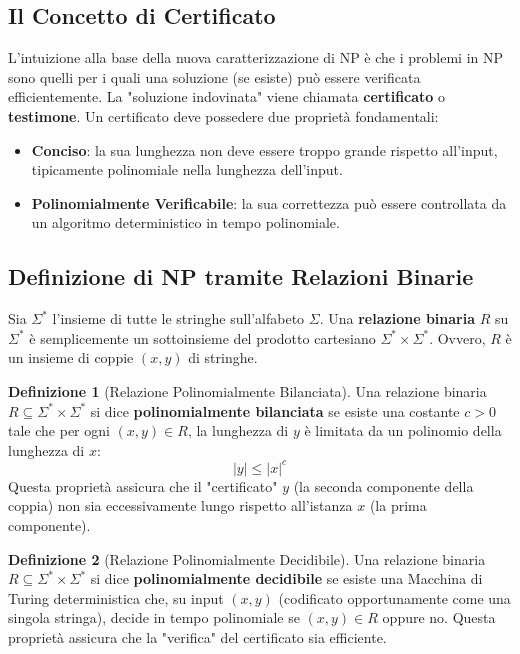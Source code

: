 \documentclass[a4paper]{article}
\theoremstyle{definition} %
\newtheorem{definition}{Definizione}
\begin{document}
\subsection{Il Concetto di Certificato}
L'intuizione alla base della nuova caratterizzazione di NP è che i problemi in NP sono quelli per i quali una soluzione (se esiste) può essere verificata efficientemente. La "soluzione indovinata" viene chiamata \textbf{certificato} o \textbf{testimone}.
Un certificato deve possedere due proprietà fondamentali:
\begin{itemize}
    \item \textbf{Conciso}: la sua lunghezza non deve essere troppo grande rispetto all'input, tipicamente polinomiale nella lunghezza dell'input.
    \item \textbf{Polinomialmente Verificabile}: la sua correttezza può essere controllata da un algoritmo deterministico in tempo polinomiale.
\end{itemize}

\subsection{Definizione di NP tramite Relazioni Binarie}

Sia $\Sigma^*$ l'insieme di tutte le stringhe sull'alfabeto $\Sigma$. Una \textbf{relazione binaria} $R$ su $\Sigma^*$ è semplicemente un sottoinsieme del prodotto cartesiano $\Sigma^* \times \Sigma^*$. Ovvero, $R$ è un insieme di coppie $(x, y)$ di stringhe.

\begin{definition}[Relazione Polinomialmente Bilanciata]
Una relazione binaria $R \subseteq \Sigma^* \times \Sigma^*$ si dice \textbf{polinomialmente bilanciata} se esiste una costante $c > 0$ tale che per ogni $(x, y) \in R$, la lunghezza di $y$ è limitata da un polinomio della lunghezza di $x$:
\[ |y| \le |x|^c \]
Questa proprietà assicura che il "certificato" $y$ (la seconda componente della coppia) non sia eccessivamente lungo rispetto all'istanza $x$ (la prima componente).
\end{definition}

\begin{definition}[Relazione Polinomialmente Decidibile]
Una relazione binaria $R \subseteq \Sigma^* \times \Sigma^*$ si dice \textbf{polinomialmente decidibile} se esiste una Macchina di Turing deterministica che, su input $(x, y)$ (codificato opportunamente come una singola stringa), decide in tempo polinomiale se $(x, y) \in R$ oppure no.
Questa proprietà assicura che la "verifica" del certificato sia efficiente.
\end{definition}
\end{document}
